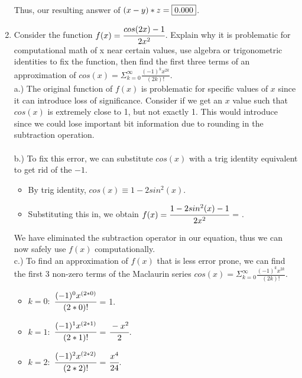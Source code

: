 \documentclass[12pt]{article}
\begin{document}
\begin{enumerate}
Thus, our resulting answer of $(x-y)*z = \fbox{0.000}$. \\

	\item Consider the function $f(x) = \cfrac{cos(2x) - 1}{2x^2}$. Explain why it is problematic for computational math of x near certain values, use algebra or trigonometric identities to fix the function, then find the first three terms of an approximation of $cos(x) = \Sigma^{\infty}_{k=0} \frac{(-1)^kx^{2k}}{(2k)!}$. \\
	
	a.) The original function of $f(x)$ is problematic for specific values of $x$ since it can introduce loss of significance. Consider if we get an $x$ value such that $cos(x)$ is extremely close to 1, but not exactly 1. This would introduce  since we could lose important bit information due to rounding in the subtraction operation. \\ \\
	b.) To fix this error, we can substitute $cos(x)$ with a trig identity equivalent to get rid of the $-1$.
	\begin{itemize}
		\item[] By trig identity, $cos(x) \equiv 1 - 2sin^2(x)$.
		\item[] Substituting this in, we obtain $f(x) = \cfrac{1-2sin^2(x) - 1}{2x^2}$ = .
	\end{itemize}

	We have eliminated the subtraction operator in our equation, thus we can now safely use $f(x)$ computationally. \\
	
	c.) To find an approximation of $f(x)$ that is less error prone, we can find the first 3 non-zero terms of the Maclaurin series $cos(x) = \Sigma^{\infty}_{k=0} \frac{(-1)^kx^{2k}}{(2k)!}$.
	\begin{itemize}
		\item[] $k=0:$ \tabto{2cm} $\cfrac{(-1)^0x^{(2*0)}}{(2*0)!}$ = 1.\\
		\item[] $k=1:$ \tabto{2cm} $\cfrac{(-1)^1x^{(2*1)}}{(2*1)!}$ = $\cfrac{-x^2}{2}$.\\
		\item[] $k=2:$ \tabto{2cm} $\cfrac{(-1)^2x^{(2*2)}}{(2*2)!}$ = $\cfrac{x^4}{24}$.
	\end{itemize}
	

\end{enumerate}
\end{document}
